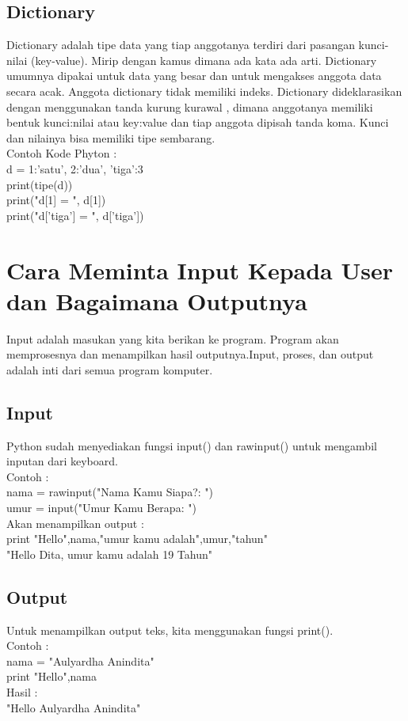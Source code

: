 \subsection{Dictionary}
Dictionary adalah tipe data yang tiap anggotanya terdiri dari pasangan kunci-nilai (key-value). Mirip dengan kamus dimana ada kata ada arti. Dictionary umumnya dipakai untuk data yang besar dan untuk mengakses anggota data secara acak. Anggota dictionary tidak memiliki indeks. Dictionary dideklarasikan dengan menggunakan tanda kurung kurawal { }, dimana anggotanya memiliki bentuk kunci:nilai atau key:value dan tiap anggota dipisah tanda koma. Kunci dan nilainya bisa memiliki tipe sembarang.\\
Contoh Kode Phyton : \\
d = {1:'satu', 2:'dua', 'tiga':3}\\
print(tipe(d))\\
print("d[1] = ", d[1])\\
print("d['tiga'] = ", d['tiga'])\\

\section{Cara Meminta Input Kepada User dan Bagaimana Outputnya}
Input adalah masukan yang kita berikan ke program.
Program akan memprosesnya dan menampilkan hasil outputnya.Input, proses, dan output adalah inti dari semua program komputer.\\
\subsection{Input}
Python sudah menyediakan fungsi input() dan rawinput() untuk mengambil inputan dari keyboard.\\
Contoh :\\
nama = rawinput("Nama Kamu Siapa?: ")\\
umur = input("Umur Kamu Berapa: ")\\

Akan menampilkan output :\\
print "Hello",nama,"umur kamu adalah",umur,"tahun"\\
"Hello Dita, umur kamu adalah 19 Tahun"\\
\subsection{Output}
Untuk menampilkan output teks, kita menggunakan fungsi print().\\
Contoh :\\
nama = "Aulyardha Anindita"\\
print "Hello",nama\\
Hasil :\\
"Hello Aulyardha Anindita"\\

